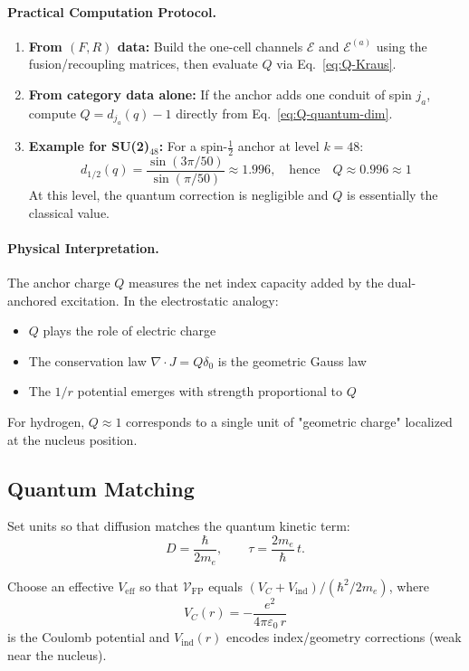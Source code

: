 \documentclass[11pt]{article}
\theoremstyle{plain}
\theoremstyle{definition}
\begin{document}
\paragraph{Practical Computation Protocol.}
\begin{enumerate}
  \item \textbf{From $(F,R)$ data:} Build the one-cell channels $\mathcal{E}$ and $\mathcal{E}^{(a)}$ using the fusion/recoupling matrices, then evaluate $Q$ via Eq.~\eqref{eq:Q-Kraus}.

  \item \textbf{From category data alone:} If the anchor adds one conduit of spin $j_a$, compute $Q = d_{j_a}(q) - 1$ directly from Eq.~\eqref{eq:Q-quantum-dim}.

  \item \textbf{Example for SU(2)$_{48}$:} For a spin-$\frac{1}{2}$ anchor at level $k=48$:
    \[
      d_{1/2}(q) = \frac{\sin(3\pi/50)}{\sin(\pi/50)} \approx 1.996, \quad \text{hence} \quad Q \approx 0.996 \approx 1
    \]
    At this level, the quantum correction is negligible and $Q$ is essentially the classical value.
\end{enumerate}

\paragraph{Physical Interpretation.}
The anchor charge $Q$ measures the net index capacity added by the dual-anchored excitation. In the electrostatic analogy:
\begin{itemize}
  \item $Q$ plays the role of electric charge
  \item The conservation law $\nabla \cdot J = Q\delta_0$ is the geometric Gauss law
  \item The $1/r$ potential emerges with strength proportional to $Q$
\end{itemize}
For hydrogen, $Q \approx 1$ corresponds to a single unit of "geometric charge" localized at the nucleus position.

\subsection{Quantum Matching}

Set units so that diffusion matches the quantum kinetic term:
\[
  D = \frac{\hbar}{2 m_e}, \qquad \tau = \frac{2 m_e}{\hbar}\, t.
\]

Choose an effective $V_{\mathrm{eff}}$ so that $\mathcal{V}_{\mathrm{FP}}$ equals $(V_C+V_{\mathrm{ind}})/(\hbar^2/2m_e)$, where
\[
  V_C(r) = -\frac{e^2}{4\pi\varepsilon_0\, r}
\]
is the Coulomb potential and $V_{\mathrm{ind}}(r)$ encodes index/geometry corrections (weak near the nucleus).
\end{document}
